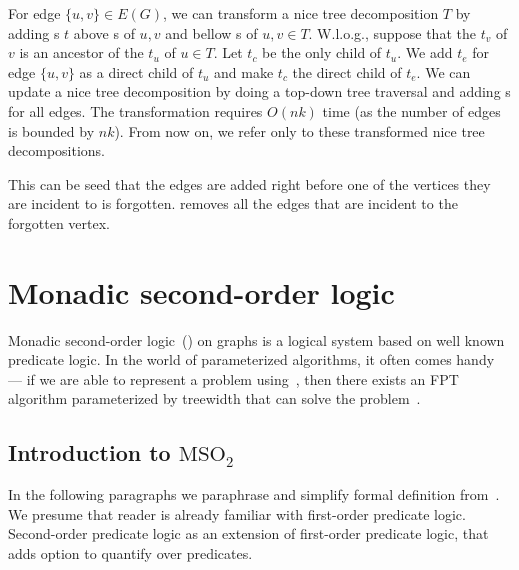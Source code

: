 For edge \( \{u, v\} \in E(G) \), we can transform a nice tree decomposition \( T \)
by adding \IntroduceEdgeNode{}s \( t \) above \IntroduceVertexNode{}s of \( u, v \)
and bellow \ForgetVertexNode{}s of \( u, v \in T \).
%
W.l.o.g., suppose that the \ForgetVertexNode{} \( t_v \) of \( v \) is
an ancestor of the \ForgetVertexNode{} \( t_u \) of \( u \in T \).
Let \( t_c \) be the only child of \( t_u \).
%
We add \IntroduceEdgeNode{} \( t_e \) for edge \( \{u, v\} \)
as a direct child of \( t_u \) and make \( t_c \) the direct child of \( t_e \).
%
We can update a nice tree decomposition by doing
a top-down tree traversal and adding \IntroduceEdgeNode{}s for all edges.
The transformation requires \( O(nk) \) time (as the number of edges is bounded by \( nk \)).
From now on, we refer only to these transformed nice tree decompositions.

%
%
This can be seed that the edges are added right before one of the vertices
they are incident to is forgotten. \ForgetVertexNode{} removes all the edges
that are incident to the forgotten vertex.


\section{Monadic second-order logic}

Monadic second-order logic~(\MSO{}) on graphs is a logical system based on
well known predicate logic.
In the world of parameterized algorithms,
it often comes handy --- if we are able to represent a problem using~\MSO{},
then there exists an FPT algorithm parameterized by treewidth
that can solve the problem~\cite{tree_width_mso}.

\subsection{Introduction to \( \text{MSO}_2 \)}

In the following paragraphs we paraphrase and simplify formal definition
from~\cite{book_parametrized_algorithms}.
We presume that reader is already familiar with first-order predicate logic.
Second-order predicate logic as an extension of first-order predicate logic,
that adds option to quantify over predicates.

